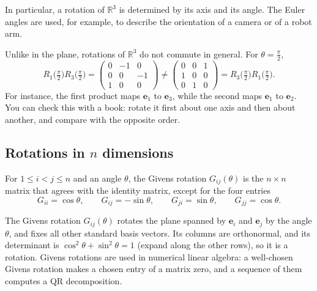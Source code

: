 In particular, a rotation of $\mathbb{R}^3$ is determined by its axis and its angle. The Euler angles are used, for example, to describe the orientation of a camera or of a robot arm.

\begin{example}
    Unlike in the plane, rotations of $\mathbb{R}^3$ do not commute in general. For $\theta = \frac{\pi}{2}$,
    \[R_1\big(\tfrac{\pi}{2}\big) R_3\big(\tfrac{\pi}{2}\big) = \begin{pmatrix} 0 & -1 & 0 \\ 0 & 0 & -1 \\ 1 & 0 & 0 \end{pmatrix} \neq \begin{pmatrix} 0 & 0 & 1 \\ 1 & 0 & 0 \\ 0 & 1 & 0 \end{pmatrix} = R_3\big(\tfrac{\pi}{2}\big) R_1\big(\tfrac{\pi}{2}\big).\]
    For instance, the first product maps $\mathbf{e}_1$ to $\mathbf{e}_3$, while the second maps $\mathbf{e}_1$ to $\mathbf{e}_2$. You can check this with a book: rotate it first about one axis and then about another, and compare with the opposite order.
\end{example}

\subsection{\texorpdfstring{Rotations in $n$ dimensions}{Rotations in n dimensions}}

\begin{definition}
    For $1 \leq i < j \leq n$ and an angle $\theta$, the Givens rotation $G_{ij}(\theta)$ is the $n \times n$ matrix that agrees with the identity matrix, except for the four entries
    \[G_{ii} = \cos\theta, \qquad G_{ij} = -\sin\theta, \qquad G_{ji} = \sin\theta, \qquad G_{jj} = \cos\theta.\]
\end{definition}

The Givens rotation $G_{ij}(\theta)$ rotates the plane spanned by $\mathbf{e}_i$ and $\mathbf{e}_j$ by the angle $\theta$, and fixes all other standard basis vectors. Its columns are orthonormal, and its determinant is $\cos^2\theta + \sin^2\theta = 1$ (expand along the other rows), so it is a rotation. Givens rotations are used in numerical linear algebra: a well-chosen Givens rotation makes a chosen entry of a matrix zero, and a sequence of them computes a QR decomposition.

